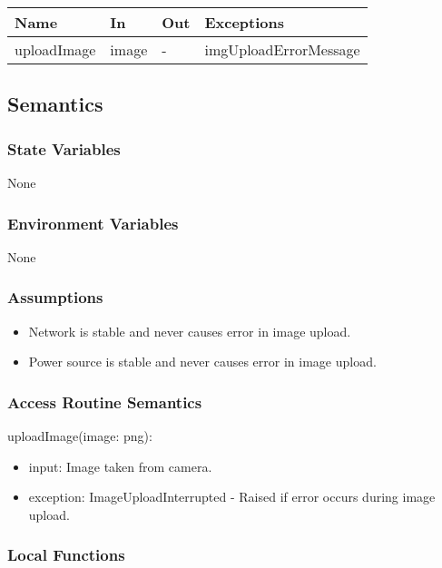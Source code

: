 \documentclass[12pt, titlepage]{article}
\begin{document}
\begin{center}
\begin{tabular}{p{4cm} p{3cm} p{3cm} p{5cm}}
\hline
\textbf{Name} & \textbf{In} & \textbf{Out} & \textbf{Exceptions} \\
\hline
uploadImage & image & - & imgUploadErrorMessage \\
\hline
\end{tabular}
\end{center}

\subsection{Semantics}

\subsubsection{State Variables}
None

\subsubsection{Environment Variables}
None

\subsubsection{Assumptions}
\begin{itemize}
	\item Network is stable and never causes error in image upload.
	\item Power source is stable and never causes error in image upload.
\end{itemize}

\subsubsection{Access Routine Semantics}

\noindent uploadImage(image: png):
\begin{itemize}
\item input: Image taken from camera. 
\item exception: ImageUploadInterrupted - Raised if error occurs during image upload.
\end{itemize}

\subsubsection{Local Functions}
\end{document}
